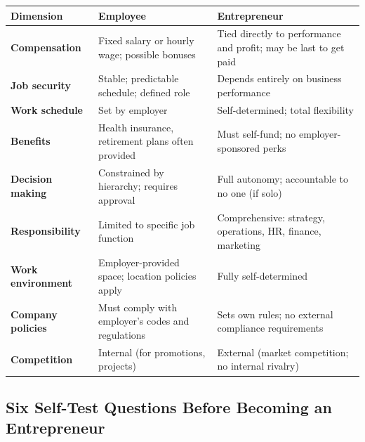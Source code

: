 \documentclass[11pt, letterpaper]{article}
\begin{document}
\begin{center}
\begin{tabular}{>{\bfseries}p{2.8cm} p{5.5cm} p{5.5cm}}
\toprule
Dimension & Employee & Entrepreneur \\
\midrule
Compensation & Fixed salary or hourly wage; possible bonuses & Tied directly to performance and profit; may be last to get paid \\
\addlinespace
Job security & Stable; predictable schedule; defined role & Depends entirely on business performance \\
\addlinespace
Work schedule & Set by employer & Self-determined; total flexibility \\
\addlinespace
Benefits & Health insurance, retirement plans often provided & Must self-fund; no employer-sponsored perks \\
\addlinespace
Decision making & Constrained by hierarchy; requires approval & Full autonomy; accountable to no one (if solo) \\
\addlinespace
Responsibility & Limited to specific job function & Comprehensive: strategy, operations, HR, finance, marketing \\
\addlinespace
Work environment & Employer-provided space; location policies apply & Fully self-determined \\
\addlinespace
Company policies & Must comply with employer's codes and regulations & Sets own rules; no external compliance requirements \\
\addlinespace
Competition & Internal (for promotions, projects) & External (market competition; no internal rivalry) \\
\bottomrule
\end{tabular}
\end{center}

\subsection{Six Self-Test Questions Before Becoming an Entrepreneur}
\end{document}
